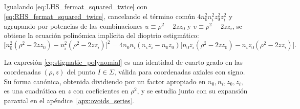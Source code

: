Igualando \eqref{eq:LHS_fermat_squared_twice} con
\eqref{eq:RHS_fermat_squared_twice}, cancelando el término común
$4n_0^2n_i^2z_0^2z_i^2$ y agrupando por potencias de las combinaciones
$u\equiv\rho^2-2zz_0$ y $v\equiv\rho^2-2zz_i$, se obtiene la ecuación
polinómica implícita del dioptrio estigmático:
\begin{equation}
\bigl[n_0^2(\rho^2-2zz_0)-n_i^2(\rho^2-2zz_i)\bigr]^2
=
4n_0n_i(n_iz_i-n_0z_0)
\bigl[n_0z_i(\rho^2-2zz_0)-n_iz_0(\rho^2-2zz_i)\bigr].
\label{eq:stigmatic_polynomial}
\end{equation}

La expresión \eqref{eq:stigmatic_polynomial} es una identidad de cuarto grado
en las coordenadas $(\rho,z)$ del punto $I\in\Sigma$, válida para
coordenadas axiales con signo. Su forma canónica, obtenida dividiendo por un
factor apropiado en $n_0,n_i,z_0,z_i$, es una cuadrática en $z$ con
coeficientes en $\rho^2$, y se estudia junto con su expansión paraxial en el
apéndice~\ref{apx:ovoids_series}.
